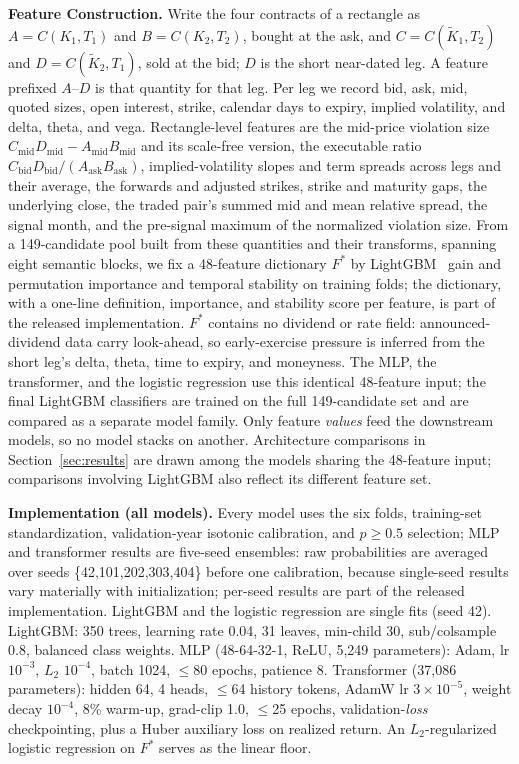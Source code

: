 \documentclass[sigconf,review]{acmart}
\begin{document}
\medskip\noindent\textbf{Feature Construction.}
\label{sec:features}
Write the four contracts of a rectangle as $A=C(K_1,T_1)$ and $B=C(K_2,T_2)$, bought at the ask, and $C=C(\tilde K_1,T_2)$ and $D=C(\tilde K_2,T_1)$, sold at the bid; $D$ is the short near-dated leg. A feature prefixed $A$--$D$ is that quantity for that leg. Per leg we record bid, ask, mid, quoted sizes, open interest, strike, calendar days to expiry, implied volatility, and delta, theta, and vega. Rectangle-level features are the mid-price violation size $C_{\mathrm{mid}}D_{\mathrm{mid}}-A_{\mathrm{mid}}B_{\mathrm{mid}}$ and its scale-free version, the executable ratio $C_{\mathrm{bid}}D_{\mathrm{bid}}/(A_{\mathrm{ask}}B_{\mathrm{ask}})$, implied-volatility slopes and term spreads across legs and their average, the forwards and adjusted strikes, strike and maturity gaps, the underlying close, the traded pair's summed mid and mean relative spread, the signal month, and the pre-signal maximum of the normalized violation size. From a 149-candidate pool built from these quantities and their transforms, spanning eight semantic blocks, we fix a 48-feature dictionary $F^{\ast}$ by LightGBM~\cite{ke2017lightgbm} gain and permutation importance and temporal stability on training folds; the dictionary, with a one-line definition, importance, and stability score per feature, is part of the released implementation. $F^{\ast}$ contains no dividend or rate field: announced-dividend data carry look-ahead, so early-exercise pressure is inferred from the short leg's delta, theta, time to expiry, and moneyness. The MLP, the transformer, and the logistic regression use this identical 48-feature input; the final LightGBM classifiers are trained on the full 149-candidate set and are compared as a separate model family. Only feature \emph{values} feed the downstream models, so no model stacks on another. Architecture comparisons in Section~\ref{sec:results} are drawn among the models sharing the 48-feature input; comparisons involving LightGBM also reflect its different feature set.

\noindent\textbf{Implementation (all models).} Every model uses the six folds, training-set standardization, validation-year isotonic calibration, and $p\ge0.5$ selection; MLP and transformer results are five-seed ensembles: raw probabilities are averaged over seeds \{42,101,202,303,404\} before one calibration, because single-seed results vary materially with initialization; per-seed results are part of the released implementation. LightGBM and the logistic regression are single fits (seed 42). LightGBM: 350 trees, learning rate 0.04, 31 leaves, min-child 30, sub/colsample 0.8, balanced class weights. MLP (48-64-32-1, ReLU, 5{,}249 parameters): Adam, lr $10^{-3}$, $L_2$ $10^{-4}$, batch 1024, $\le$80 epochs, patience 8. Transformer (37{,}086 parameters): hidden 64, 4 heads, $\le$64 history tokens, AdamW lr $3{\times}10^{-5}$, weight decay $10^{-4}$, 8\% warm-up, grad-clip 1.0, $\le$25 epochs, validation-\emph{loss} checkpointing, plus a Huber auxiliary loss on realized return. An $L_2$-regularized logistic regression on $F^{\ast}$ serves as the linear floor.
\end{document}
